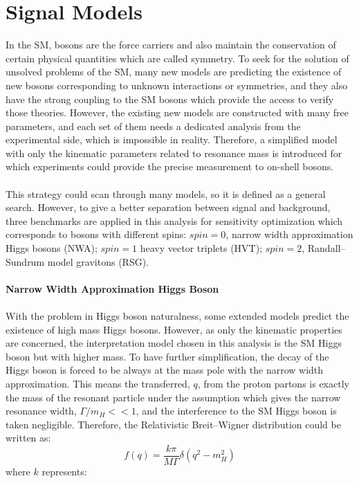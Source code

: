 \section{Signal Models}
\label{sec:signal_intro}
In the SM, bosons are the force carriers and also maintain the conservation of certain physical quantities which are called symmetry. To seek for the solution of unsolved problems of the SM, many new models are predicting the existence of new bosons corresponding to unknown interactions or symmetries, and they also have the strong coupling to the SM bosons which provide the access to verify those theories. However, the existing new models are constructed with many free parameters, and each set of them needs a dedicated analysis from the experimental side, which is impossible in reality. Therefore, a simplified model with only the kinematic parameters related to resonance mass is introduced for which experiments could provide the precise measurement to on-shell bosons.  
\\
\\This strategy could scan through many models, so it is defined as a general search. However, to give a better separation between signal and background, three benchmarks are applied in this analysis for sensitivity optimization which corresponds to bosons with different spins: $spin=0$, narrow width approximation Higgs bosons (NWA); $spin=1$ heavy vector triplets (HVT); $spin=2$, Randall–Sundrum model gravitons (RSG).
\\
\\{\bf Narrow Width Approximation Higgs Boson}
\\
\\With the problem in Higgs boson naturalness, some extended models predict the existence of high mass Higgs bosons. However, as only the kinematic properties are concerned, the interpretation model chosen in this analysis is the SM Higgs boson but with higher mass. To have further simplification, the decay of the Higgs boson is forced to be always at the mass pole with the narrow width approximation. This means the transferred, $q$, from the proton partons is exactly the mass of the resonant particle under the assumption which gives the narrow resonance width, $\Gamma/m_{H}<<1$, and the interference to the SM Higgs boson is taken negligible. Therefore, the Relativistic Breit–Wigner distribution could be written as:
\begin{equation}
f(q) = \frac{k\pi}{M\Gamma}\delta(q^2-m_{H}^2)
\end{equation}
where $k$ represents:
